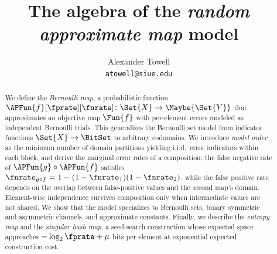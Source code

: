 \documentclass[11pt,final,hidelinks]{article}
\title
{
    The algebra of the \emph{random approximate map} model
}
\author
{
    Alexander Towell\\
    \texttt{atowell@siue.edu}
}
\date{}
\begin{document}
\maketitle
\begin{abstract}
We define the \emph{Bernoulli map}, a probabilistic function $\APFun{f}[\fprate][\fnrate] \colon \Set{X} \to \Maybe{\Set{Y}}$ that approximates an objective map $\Fun{f}$ with per-element errors modeled as independent Bernoulli trials. This generalizes the Bernoulli set model from indicator functions $\Set{X} \to \BitSet$ to arbitrary codomains. We introduce \emph{model order} as the minimum number of domain partitions yielding i.i.d.\ error indicators within each block, and derive the marginal error rates of a composition: the false negative rate of $\APFun{g} \circ \APFun{f}$ satisfies $\fnrate_{g \circ f} = 1 - (1-\fnrate_1)(1-\fnrate_2)$, while the false positive rate depends on the overlap between false-positive values and the second map's domain. Element-wise independence survives composition only when intermediate values are not shared. We show that the model specializes to Bernoulli sets, binary symmetric and asymmetric channels, and approximate constants. Finally, we describe the \emph{entropy map} and the \emph{singular hash map}, a seed-search construction whose expected space approaches $-\log_2 \fprate + \mu$ bits per element at exponential expected construction cost.
\end{abstract}



\tableofcontents










\end{document}
